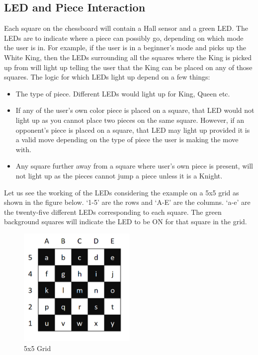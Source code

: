 \documentclass[12pt, titlepage]{article}
\begin{document}
\subsection{LED and Piece Interaction}
Each square on the chessboard will contain a Hall sensor and a green LED. The LEDs are to indicate where a piece can possibly go, depending on which mode the user is in. For example, 
if the user is in a beginner’s mode and picks up the White King, then the LEDs surrounding all the squares where the King is picked up from will light up telling the user that the 
King can be placed on any of those squares. The logic for which LEDs light up depend on a few things:
\begin{itemize}
  \item The type of piece. Different LEDs would light up for King, Queen etc.
  \item If any of the user’s own color piece is placed on a square, that LED would not light up as you cannot place two pieces on the same square. However, if an opponent’s piece is 
  placed on a square, that LED may light up provided it is a valid move depending on the type of piece the user is making the move with.
  \item Any square further away from a square where user’s own piece is present, will not light up as the pieces cannot jump a piece unless it is a Knight.
\end{itemize}
  Let us see the working of the LEDs considering the example on a 5x5 grid as shown in the figure below. ‘1-5’ are the rows and ‘A-E’ are the columns. ‘a-e’ are the twenty-five different LEDs corresponding to 
  each square. The green background squares will indicate the LED to be ON for that square in the grid.

  \begin{figure}[h]
    \centering
    \includegraphics[width=0.5\textwidth]{line2}
    \caption{5x5 Grid}
  \end{figure}
\end{document}
